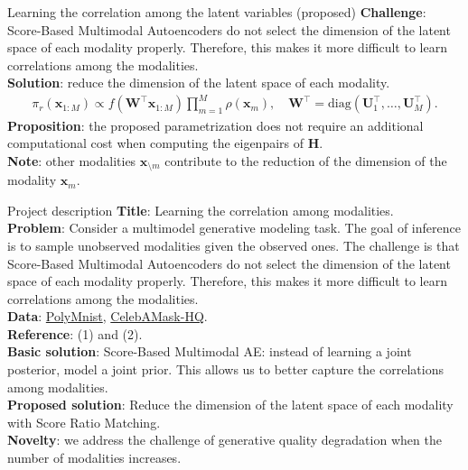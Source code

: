 \documentclass[aspectratio=169]{beamer}
\begin{document}
\begin{frame}{Learning the correlation among the latent variables (proposed)}
    \textbf{Challenge}: Score-Based Multimodal Autoencoders do not select the dimension of the latent
    space of each modality properly. Therefore, this makes it more difficult to learn correlations among the
    modalities. \\
    \textbf{Solution}: reduce the dimension of the latent space of each modality.
    \begin{align*}
        \pi_r(\mathbf{x}_{1:M}) \propto f(\mathbf{W}^\top\mathbf{x}_{1:M})\prod_{m=1}^M\rho(\mathbf{x}_m), \quad
        \mathbf{W}^\top = \mathrm{diag}(\mathbf{U}_1^\top, \ldots, \mathbf{U}_M^\top).
    \end{align*}
    \textbf{Proposition}: the proposed parametrization does not require an additional computational cost
    when computing the eigenpairs of $\mathbf{H}$. \\
    \textbf{Note}: other modalities $\mathbf{x}_{\setminus m}$ contribute to the reduction of the dimension of
    the modality $\mathbf{x}_m$.

\end{frame}


\begin{frame}{Project description}
    \textbf{Title}: Learning the correlation among modalities. \\
    \textbf{Problem}: Consider a multimodel generative modeling task. The goal of inference is to sample unobserved modalities
    given the observed ones. The challenge is that Score-Based Multimodal Autoencoders do not select the dimension of the latent
    space of each modality properly. Therefore, this makes it more difficult to learn correlations among the
    modalities.\\
    \textbf{Data}: \href{https://openreview.net/forum?id=5Y21V0RDBV}{PolyMnist},
    \href{https://openaccess.thecvf.com/content_CVPR_2020/papers/Lee_MaskGAN_Towards_Diverse_and_Interactive_Facial_Image_Manipulation_CVPR_2020_paper.pdf}{CelebAMask-HQ}. \\
    \textbf{Reference}: (1) and (2). \\
    \textbf{Basic solution}: Score-Based Multimodal AE: instead of learning a joint posterior,
     model a joint prior. This allows us to better capture the correlations among modalities. \\
    \textbf{Proposed solution}: Reduce the dimension of the latent space of each modality with Score Ratio Matching. \\
    \textbf{Novelty}: we address the challenge of generative quality degradation when the number of modalities increases.
\end{frame}
\end{document}
